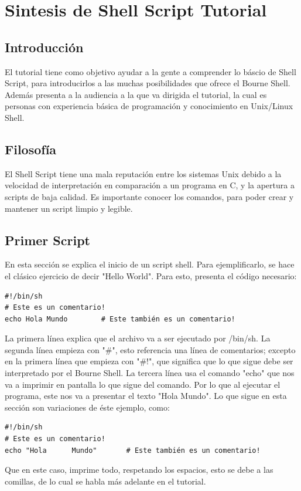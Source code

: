 \documentclass[a4paper]{article}
\begin{document}
\section{Sintesis de Shell Script Tutorial}
\subsection{Introducción}
El tutorial tiene como objetivo ayudar a la gente a comprender lo báscio de Shell Script, para introducirlos a las muchas posibilidades que ofrece el Bourne Shell. Además presenta a la audiencia a la que va dirigida el tutorial, la cual es personas con experiencia básica de programación y conocimiento en Unix/Linux Shell. 

\subsection{Filosofía}
El Shell Script tiene una mala reputación entre los sistemas Unix debido a la velocidad de interpretación en comparación a un programa en C, y la apertura a scripts de baja calidad. Es importante conocer los comandos, para poder crear y mantener un script limpio y legible. 

\subsection{Primer Script}
En esta sección se explica el inicio de un script shell. Para ejemplificarlo, se hace el clásico ejercicio de decir "Hello World". Para esto, presenta el código necesario: 
\begin{verbatim}
#!/bin/sh
# Este es un comentario!
echo Hola Mundo        # Este también es un comentario!
\end{verbatim}
La primera línea explica que el archivo va a ser ejecutado por /bin/sh. La segunda línea empieza con "\#", esto referencia una línea de comentarios; excepto en la primera línea que empieza con "\#!", que significa que lo que sigue debe ser interpretado por el Bourne Shell. La tercera línea usa el comando "echo" que nos va a imprimir en pantalla lo que sigue del comando. Por lo que al ejecutar el programa, este nos va a presentar el texto "Hola Mundo". Lo que sigue en esta sección son variaciones de éste ejemplo, como:
\begin{verbatim}
#!/bin/sh
# Este es un comentario!
echo "Hola      Mundo"       # Este también es un comentario!
\end{verbatim}
Que en este caso, imprime todo, respetando los espacios, esto se debe a las comillas, de lo cual se habla más adelante en el tutorial.
\end{document}
